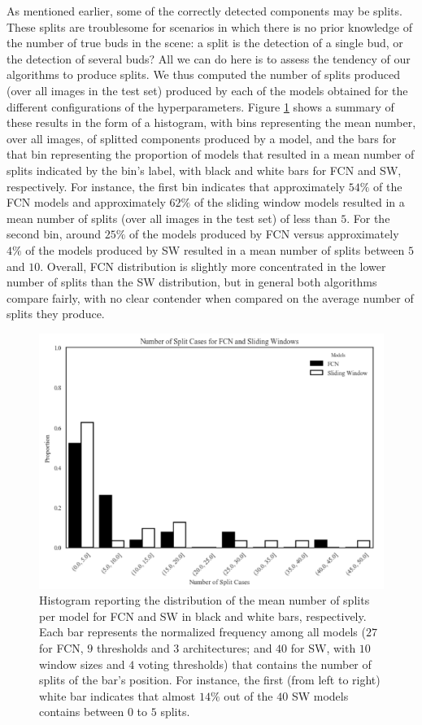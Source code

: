 \documentclass[a4paper,authoryear,review]{elsarticle}
\begin{document}
As mentioned earlier, some of the correctly detected components may be splits. These splits are troublesome for scenarios in which there is no prior knowledge of the number of true buds in the scene: a split is the detection of a single bud, or the detection of several buds? All we can do here is to assess the tendency of our algorithms to produce splits.  We thus computed the number of splits produced (over all images in the test set) produced by each of the models obtained for the different configurations of the hyperparameters. Figure \ref{fig:number-of-split} shows a summary of these results in the form of a histogram, with bins representing the mean number, over all images, of splitted components produced by a model, and the bars for that bin representing the proportion of models that resulted in a mean number of splits indicated by the bin’s label, with  black and white bars for FCN and SW, respectively. For instance, the first bin indicates that approximately $54\%$ of the FCN models and approximately $62\%$ of the sliding window models resulted in a mean number of splits (over all images in the test set) of less than $5$. For the second bin, around $25\%$ of the models produced by FCN versus approximately $4\%$ of the models produced by SW resulted in a mean number of splits between $5$ and $10$. Overall, FCN distribution is slightly more concentrated in the lower number of splits than the SW distribution, but in general both algorithms compare fairly, with no clear contender when compared on the average number of splits they produce. 

\begin{figure}
	\centering
	\includegraphics[width=12cm]{figures/number-of-split.png}
	\caption{Histogram reporting the distribution of the mean number of splits per model for FCN and SW in black and white bars, respectively. Each bar represents the normalized frequency among all models ($27$ for FCN, $9$ thresholds and $3$ architectures;  and $40$ for SW, with $10$ window sizes and $4$ voting thresholds) that contains the number of splits of the bar’s position. For instance, the first (from left to right) white bar indicates that almost $14\%$ out of the $40$ SW models contains between $0$ to $5$ splits. }
	\label{fig:number-of-split}
\end{figure}
\end{document}
